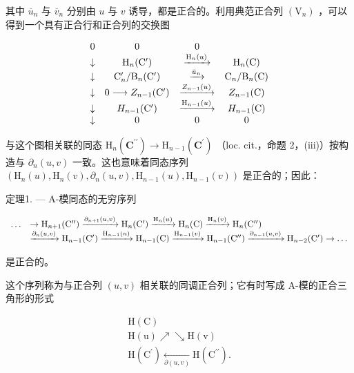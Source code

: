 其中 \(\overline{u}_{n}\) 与 \(\overline{v}_{n}\) 分别由 \(u\) 与 \(v\) 诱导，都是正合的。利用典范正合列 \((\mathrm{V}_{n})\) ，可以得到一个具有正合行和正合列的交换图

\[
\begin{array}{c c c c} 0 & 0 & 0 \\ \downarrow & \mathrm{H} _ {n} (\mathrm{C} ^ {\prime}) & \xrightarrow {\mathrm{H} _ {n} (u)} & \mathrm{H} _ {n} (\mathrm{C}) \\ \downarrow & \mathrm{C} _ {n} ^ {\prime} / \mathrm{B} _ {n} (\mathrm{C} ^ {\prime}) & \xrightarrow {\bar {u} _ {n}} & \mathrm{C} _ {n} / \mathrm{B} _ {n} (\mathrm{C}) \\ \downarrow & 0 \longrightarrow Z _ {n - 1} (\mathrm{C} ^ {\prime}) & \xrightarrow {Z _ {n - 1} (u)} & Z _ {n - 1} (\mathrm{C}) \\ \downarrow & H _ {n - 1} (\mathrm{C} ^ {\prime}) & \xrightarrow {\mathrm{H} _ {n - 1} (u)} & H _ {n - 1} (\mathrm{C}) \\ \downarrow & 0 & 0 & 0 \end{array}
\]

与这个图相关联的同态 \(\mathrm{H}_{n}(\mathbf{C}^{\prime \prime})\to \mathrm{H}_{n - 1}(\mathbf{C}^{\prime})\) （loc. cit.，命题 2，(iii)）按构造与 \(\partial_n(u,v)\) 一致。这也意味着同态序列 \((\mathrm{H}_n(u),\mathrm{H}_n(v),\partial_n(u,v),\mathrm{H}_{n - 1}(u),\mathrm{H}_{n - 1}(v))\) 是正合的；因此：

定理1. --- A-模同态的无穷序列

\[
\begin{array}{r l} \dots & \to \mathrm{H} _ {n + 1} (\mathrm{C} ^ {\prime \prime}) \xrightarrow {\partial_ {n + 1} (u , v)} \mathrm{H} _ {n} (\mathrm{C} ^ {\prime}) \xrightarrow {\mathrm{H} _ {n} (u)} \mathrm{H} _ {n} (\mathrm{C}) \xrightarrow {\mathrm{H} _ {n} (v)} \mathrm{H} _ {n} (\mathrm{C} ^ {\prime \prime}) \\ & \xrightarrow {\partial_ {n} (u , v)} \mathrm{H} _ {n - 1} (\mathrm{C} ^ {\prime}) \xrightarrow {\mathrm{H} _ {n - 1} (u)} \mathrm{H} _ {n - 1} (\mathrm{C}) \xrightarrow {\mathrm{H} _ {n - 1} (v)} \mathrm{H} _ {n - 1} (\mathrm{C} ^ {\prime \prime}) \xrightarrow {\partial_ {n - 1} (u , v)} \mathrm{H} _ {n - 2} (\mathrm{C} ^ {\prime}) \to \dots \end{array}
\]

是正合的。

这个序列称为与正合列 \((u, v)\) 相关联的同调正合列；它有时写成 A-模的正合三角形的形式

\[
\begin{array}{c} \mathrm{H(C)} \\ \mathrm{H(u)} \nearrow \searrow \mathrm{H(v)} \\ \mathrm {H(C^ {\prime})} \xleftarrow [ \partial (u , v) ]{} \mathrm {H(C^{\prime\prime})}. \end{array}
\]

